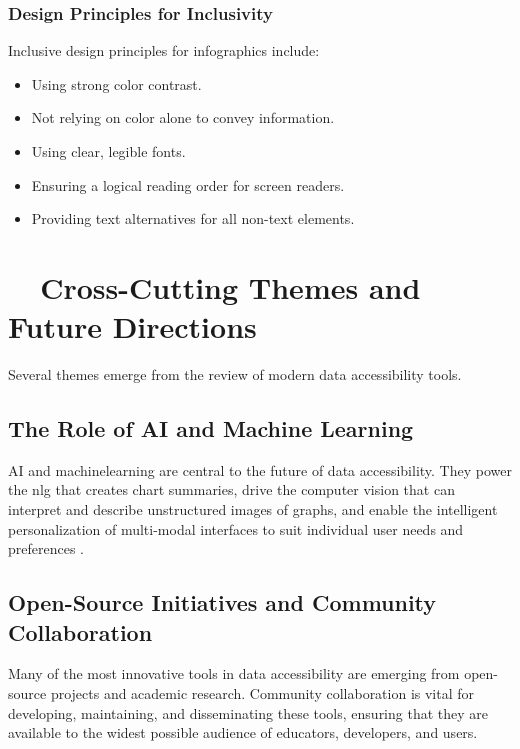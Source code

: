 \subsubsection{Design Principles for Inclusivity}\label{ch13:sssec:inclusive-design}
Inclusive design principles for infographics include:
\begin{itemize}
	\item Using strong color contrast.
	\item Not relying on color alone to convey information.
	\item Using clear, legible fonts.
	\item Ensuring a logical reading order for screen readers.
	\item Providing text alternatives for all non-text elements.
\end{itemize}
\supercite{DoNoHarmGuide, ContrastChecker, WCAG21LevelAA}

\section{~~Cross-Cutting Themes and Future Directions}\label{ch13:sec:future-directions}
Several themes emerge from the review of modern data accessibility tools.

\subsection{The Role of AI and Machine Learning}\label{ch13:ssec:ai-role}
\gls{AI} and \gls{machinelearning} are central to the future of data accessibility. They power the \gls{nlg} that creates chart summaries, drive the computer vision that can interpret and describe unstructured images of graphs, and enable the intelligent personalization of multi-modal interfaces to suit individual user needs and preferences \supercite{RECOG, NLGMeaning}.

\subsection{Open-Source Initiatives and Community Collaboration}\label{ch13:ssec:open-source}
Many of the most innovative tools in data accessibility are emerging from open-source projects and academic research. Community collaboration is vital for developing, maintaining, and disseminating these tools, ensuring that they are available to the widest possible audience of educators, developers, and users.

